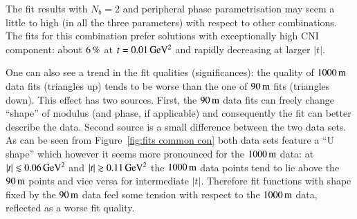 The fit results with $N_b = 2$ and peripheral phase parametrisation may seem a little to high (in all the three parameters) with respect to other combinations. The fits for this combination prefer solutions with exceptionally high CNI component: about $6\,{\rm \%}$ at $t = 0.01\,{\rm GeV^2}$ and rapidly decreasing at larger $|t|$. 

One can also see a trend in the fit qualities (significances): the quality of $1000\,{\rm m}$ data fits (triangles up) tends to be worse than the one of $90\,{\rm m}$ fits (triangles down). This effect has two sources. First, the $90\,{\rm m}$ data fits can freely change ``shape'' of modulus (and phase, if applicable) and consequently the fit can better describe the data. Second source is a small difference between the two data sets. As can be seen from Figure~\ref{fig:fits common con} both data sets feature a ``U shape'' which however it seems more pronounced for the $1000\,{\rm m}$ data: at $|t| \lesssim 0.06\,{\rm GeV^2}$ and $|t| \gtrsim 0.11\,{\rm GeV^2}$ the $1000\,{\rm m}$ data points tend to lie above the $90\,{\rm m}$ points and vice versa for intermediate $|t|$. Therefore fit functions with shape fixed by the $90\,{\rm m}$ data feel some tension with respect to the $1000\,{\rm m}$ data, reflected as a worse fit quality.
